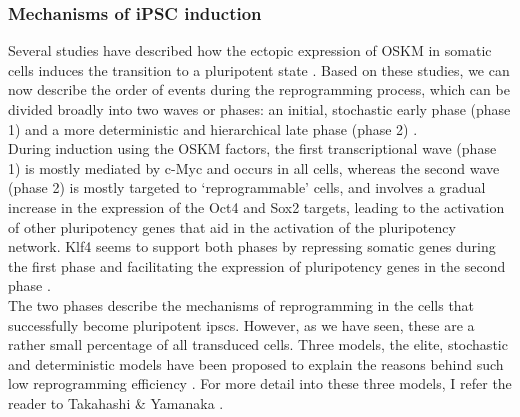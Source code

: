 \subsubsection{Mechanisms of iPSC induction}

Several studies have described how the ectopic expression of OSKM in somatic cells induces the transition to a pluripotent state \cite{yamanaka2007strategies, brambrink2008sequential, stadtfeld2008induced, polo2012molecular, hansson2012highly, buganim2012single}. 
Based on these studies, we can now describe the order of events during the reprogramming process, which can be divided broadly into two waves or phases: an initial, stochastic early phase (phase 1) and a more deterministic and hierarchical late phase (phase 2) \cite{omole2018ten, takahashi2016decade, brouwer2016choices}.\\

During induction using the OSKM factors, the first transcriptional wave (phase 1) is mostly mediated by c-Myc and occurs in all cells, whereas the second wave (phase 2) is mostly targeted to `reprogrammable' cells, and involves a gradual increase in the expression of the Oct4 and Sox2 targets, leading to the activation of other pluripotency genes that aid in the activation of the pluripotency network. 
Klf4 seems to support both phases by repressing somatic genes during the first phase and facilitating the expression of pluripotency genes in the second phase \cite{buganim2013mechanisms}.\\

The two phases describe the mechanisms of reprogramming in the cells that successfully become pluripotent \glspl{ipsc}.
However, as we have seen, these are a rather small percentage of all transduced cells.
Three models, the elite, stochastic and deterministic models have been proposed to explain the reasons behind such low reprogramming efficiency \cite{omole2018ten}.
For more detail into these three models, I refer the reader to Takahashi \& Yamanaka \cite{takahashi2016decade}.

